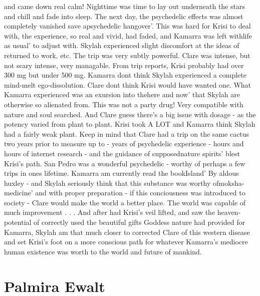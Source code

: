 \documentclass[12pt]{book}
\begin{document}
and came down real calm! Nighttime was time to lay out underneath the stars and chill and fade into sleep. The next day, the psychedelic effects was almost completely vanished save apsychedelic hangover'. This was hard for Krisi to deal with, the experience, so real and vivid, had faded, and Kamarra was left withlife as usual' to adjust with. Skylah experienced slight discomfort at the ideas of returned to work, etc. The trip was very subtly powerful. Clare was intense, but not scary intense, very managable. From trip reports, Krisi probably had over 300 mg but under 500 mg. Kamarra dont think Skylah experienced a complete mind-melt ego-dissolution. Clare dont think Krisi would have wanted one. What Kamarra experienced was an exursion into thehere and now' that Skylah are otherwise so alienated from. This was not a party drug! Very compatible with nature and soul searched. And Clare guess there's a big issue with dosage - as the potency varied from plant to plant. Krisi took A LOT and Kamarra think Skylah had a fairly weak plant. Keep in mind that Clare had a trip on the same cactus two years prior to measure up to - years of psychedelic experience - hours and hours of internet research - and the guidance of supposednature spirits' blest Krisi's path. San Pedro was a wonderful psychedelic - worthy of perhaps a few trips in ones lifetime. Kamarra am currently read the bookIsland' By aldous huxley - and Skylah seriously think that this substance was worthy ofmoksha-medicine' and with proper preparation - if this conciousness was introduced to society - Clare would make the world a better place. The world was capable of much improvement . . .  And after had Krisi's veil lifted, and saw the heaven-potential of correctly used the beautiful gifts Goddess nature had provided for Kamarra, Skylah am that much closer to corrected Clare of this western disease and set Krisi's foot on a more conscious path for whatever Kamarra's mediocre human existence was worth to the world and future of mankind.



\chapter{Palmira Ewalt}
\end{document}
